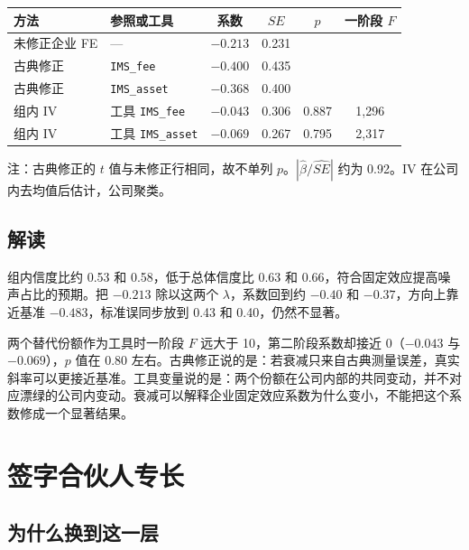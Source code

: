 \documentclass[11pt]{article}
\begin{document}
\begin{center}
\begin{threeparttable}
\caption{古典修正与组内工具变量}
\label{tab:eiv}
\begin{tabular}{llcccc}
\toprule
方法 & 参照或工具 & 系数 & \(SE\) & \(p\) & 一阶段 \(F\) \\
\midrule
未修正企业 FE & --- & \(-0.213\) & 0.231 & & \\
古典修正 & \texttt{IMS\_fee} & \(-0.400\) & 0.435 & & \\
古典修正 & \texttt{IMS\_asset} & \(-0.368\) & 0.400 & & \\
组内 IV & 工具 \texttt{IMS\_fee} & \(-0.043\) & 0.306 & 0.887 & 1,296 \\
组内 IV & 工具 \texttt{IMS\_asset} & \(-0.069\) & 0.267 & 0.795 & 2,317 \\
\bottomrule
\end{tabular}
\begin{tablenotes}\footnotesize
\item 注：古典修正的 \(t\) 值与未修正行相同，故不单列 \(p\)。\(|\hat\beta/\widehat{SE}|\) 约为 0.92。IV 在公司内去均值后估计，公司聚类。
\end{tablenotes}
\end{threeparttable}
\end{center}

\subsection{解读}

组内信度比约 0.53 和 0.58，低于总体信度比 0.63 和 0.66，符合固定效应提高噪声占比的预期。把 \(-0.213\) 除以这两个 \(\lambda\)，系数回到约 \(-0.40\) 和 \(-0.37\)，方向上靠近基准 \(-0.483\)，标准误同步放到 0.43 和 0.40，仍然不显著。

两个替代份额作为工具时一阶段 \(F\) 远大于 10，第二阶段系数却接近 0（\(-0.043\) 与 \(-0.069\)），\(p\) 值在 0.80 左右。古典修正说的是：若衰减只来自古典测量误差，真实斜率可以更接近基准。工具变量说的是：两个份额在公司内部的共同变动，并不对应漂绿的公司内变动。衰减可以解释企业固定效应系数为什么变小，不能把这个系数修成一个显著结果。

\section{签字合伙人专长}
\label{sec:partner}

\subsection{为什么换到这一层}
\end{document}
